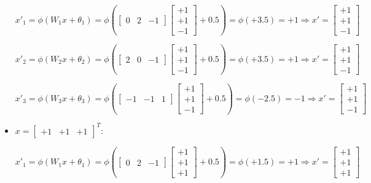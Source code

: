 \documentclass[letterpaper,headings=standardclasses]{scrartcl}
\begin{document}
\begin{itemize}
$$ x'_{1} = \phi(W_1 x + \theta_1) = \phi \left( \left[ \begin{matrix} 0 & 2 & -1 \end{matrix} \right] \left[ \begin{matrix} +1 \\ +1 \\ -1 \end{matrix} \right] + 0.5 \right) = \phi \left( +3.5 \right) = +1 \Rightarrow x' = \left[ \begin{matrix} +1 \\ +1 \\ -1 \end{matrix} \right] $$

$$ x'_{2} = \phi(W_2 x + \theta_2) = \phi \left( \left[ \begin{matrix} 2 & 0 & -1 \end{matrix} \right] \left[ \begin{matrix} +1 \\ +1 \\ -1 \end{matrix} \right] + 0.5 \right) = \phi \left( +3.5 \right) = +1 \Rightarrow x' = \left[ \begin{matrix} +1 \\ +1 \\ -1 \end{matrix} \right] $$

$$ x'_{3} = \phi(W_3 x + \theta_3) = \phi \left( \left[ \begin{matrix} -1 & -1 & 1 \end{matrix} \right] \left[ \begin{matrix} +1 \\ +1 \\ -1 \end{matrix} \right] + 0.5 \right) = \phi \left( -2.5 \right) = -1 \Rightarrow x' = \left[ \begin{matrix} +1 \\ +1 \\ -1 \end{matrix} \right] $$

\item $x = [\begin{matrix} +1 & +1 & +1 \end{matrix}]^T$:

$$ x'_{1} = \phi(W_1 x + \theta_1) = \phi \left( \left[ \begin{matrix} 0 & 2 & -1 \end{matrix} \right] \left[ \begin{matrix} +1 \\ +1 \\ +1 \end{matrix} \right] + 0.5 \right) = \phi \left( +1.5 \right) = +1 \Rightarrow x' = \left[ \begin{matrix} +1 \\ +1 \\ +1 \end{matrix} \right] $$


\end{itemize}
\end{document}
